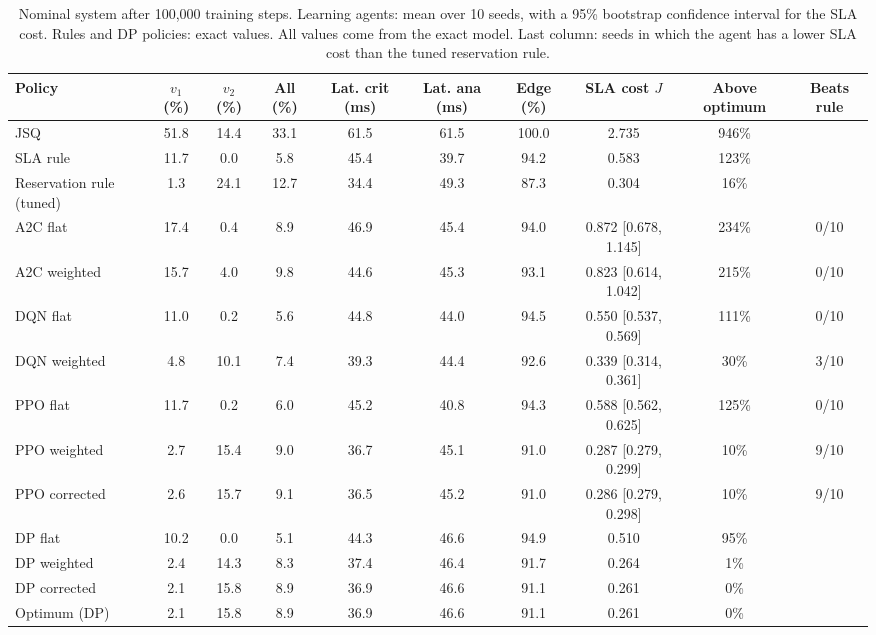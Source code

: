 \documentclass[journal]{IEEEtran}
\begin{document}
\begin{table}[t]
\caption{Nominal system after 100,000 training steps. Learning agents: mean over 10 seeds, with a 95\% bootstrap confidence interval for the SLA cost. Rules and DP policies: exact values. All values come from the exact model. Last column: seeds in which the agent has a lower SLA cost than the tuned reservation rule.}
\label{tab:main}
\centering
\footnotesize
\setlength{\tabcolsep}{3.2pt}
\begin{tabular}{@{}lccccccccc@{}}
\toprule
Policy & $v_1$ (\%) & $v_2$ (\%) & All (\%) & Lat. crit (ms) & Lat. ana (ms) & Edge (\%) & SLA cost $J$ & Above optimum & Beats rule \\
\midrule
JSQ & 51.8 & 14.4 & 33.1 & 61.5 & 61.5 & 100.0 & 2.735 & 946\% & \\
SLA rule & 11.7 & 0.0 & 5.8 & 45.4 & 39.7 & 94.2 & 0.583 & 123\% & \\
Reservation rule (tuned) & 1.3 & 24.1 & 12.7 & 34.4 & 49.3 & 87.3 & 0.304 & 16\% & \\
\midrule
A2C flat & 17.4 & 0.4 & 8.9 & 46.9 & 45.4 & 94.0 & 0.872 [0.678, 1.145] & 234\% & 0/10 \\
A2C weighted & 15.7 & 4.0 & 9.8 & 44.6 & 45.3 & 93.1 & 0.823 [0.614, 1.042] & 215\% & 0/10 \\
DQN flat & 11.0 & 0.2 & 5.6 & 44.8 & 44.0 & 94.5 & 0.550 [0.537, 0.569] & 111\% & 0/10 \\
DQN weighted & 4.8 & 10.1 & 7.4 & 39.3 & 44.4 & 92.6 & 0.339 [0.314, 0.361] & 30\% & 3/10 \\
PPO flat & 11.7 & 0.2 & 6.0 & 45.2 & 40.8 & 94.3 & 0.588 [0.562, 0.625] & 125\% & 0/10 \\
PPO weighted & 2.7 & 15.4 & 9.0 & 36.7 & 45.1 & 91.0 & 0.287 [0.279, 0.299] & 10\% & 9/10 \\
PPO corrected & 2.6 & 15.7 & 9.1 & 36.5 & 45.2 & 91.0 & 0.286 [0.279, 0.298] & 10\% & 9/10 \\
\midrule
DP flat & 10.2 & 0.0 & 5.1 & 44.3 & 46.6 & 94.9 & 0.510 & 95\% & \\
DP weighted & 2.4 & 14.3 & 8.3 & 37.4 & 46.4 & 91.7 & 0.264 & 1\% & \\
DP corrected & 2.1 & 15.8 & 8.9 & 36.9 & 46.6 & 91.1 & 0.261 & 0\% & \\
Optimum (DP) & 2.1 & 15.8 & 8.9 & 36.9 & 46.6 & 91.1 & 0.261 & 0\% & \\
\bottomrule
\end{tabular}
\end{table}
\end{document}
